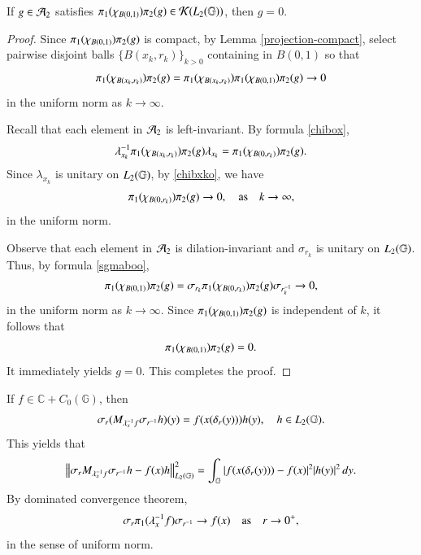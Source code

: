 \documentclass[leqno]{amsart}
\begin{document}
	\begin{lemma}\label{compact-zero}
		If $g\in{\mathcal A}_{2}$ satisfies $\pi_{1}(\chi_{B(0,1)})\pi_{2}(g)\in{\mathcal K}(L_{2}(\mathbb{G}))$, then $g=0$.
	\end{lemma}
	\begin{proof}
		Since $\pi_{1}(\chi_{B(0,1)})\pi_{2}(g)$ is compact, by Lemma \ref{projection-compact}, select  pairwise disjoint balls  $\{B(x_{k},r_{k})\}_{k>0}$ containing in $B(0,1)$ so that
		\begin{align}\label{chibxko}
			\pi_{1}(\chi_{B(x_{k},r_{k})})\pi_{2}(g)=\pi_{1}(\chi_{B(x_{k},r_{k})})\pi_{1}(\chi_{B(0,1)})\pi_{2}(g)\rightarrow0
		\end{align}
		in the uniform norm as $k\rightarrow\infty$.
		
		Recall that each element in ${\mathcal A}_{2}$ is left-invariant. By formula \eqref{chibox},
		\begin{align*}
			\lambda_{x_{k}}^{-1} \pi_{1}(\chi_{B(x_{k},r_{k})})\pi_{2}(g) \lambda_{x_{k}}=\pi_{1}(\chi_{B(0,r_{k})})\pi_{2}(g).
		\end{align*}
		Since $\lambda_{x_{k}}$ is unitary on $L_{2}(\mathbb{G})$, by \eqref{chibxko}, we have $$\pi_{1}(\chi_{B(0,r_{k})})\pi_{2}(g)\rightarrow0,\quad\mbox{as}\quad k\rightarrow\infty,$$
		in the uniform norm.
		
		Observe that each element in ${\mathcal A}_{2}$ is dilation-invariant and $\sigma_{r_{k}}$ is unitary on $L_{2}(\mathbb{G})$. Thus, by formula \eqref{sgmaboo},
		\begin{align*}
			\pi_{1}(\chi_{B(0,1)})\pi_{2}(g)=\sigma_{r_{k}}\pi_{1}(\chi_{B(0,r_{k})})\pi_{2}(g)\sigma_{r_{k}^{-1}}\rightarrow0,
		\end{align*}
		in the uniform norm as $k\rightarrow\infty$. 
		Since $\pi_{1}(\chi_{B(0,1)})\pi_{2}(g)$ is independent of $k$, it follows that
		\begin{align*}
			\pi_{1}(\chi_{B(0,1)})\pi_{2}(g)=0.
		\end{align*}
		It immediately yields $g=0$. This completes the proof.
	\end{proof}
	
	
	
	
	\medskip
	
	
	
	If $f\in \mathbb{C}+C_0(\mathbb{G})$, then
	\begin{align*}
		\sg{r}(M_{\lambda_{x}\rp f}\sg{r\rp}h)(y)%
		=f(x(\dl{r}(y)))h(y),\quad h\in\lp{2}.
	\end{align*}
	This yields that
	\begin{align*}
		\left\| \sigma_{r}M_{\lambda_{x}^{-1} f}\sigma_{r^{-1}}h-f(x)h \right\|_{L_{2}(\mathbb{G})}^{2}=\int_{\mathbb{G}}|f(x(\delta_{r}(y)))-f(x)|^{2}|h(y)|^{2}\,dy.
	\end{align*}
	By dominated convergence theorem, 
	\begin{align}\label{convergencef(x)}
		\sigma_{r}\pi_{1}(\lambda_{x}^{-1} f)\sigma_{r^{-1}}\rightarrow f(x)\quad\mbox{as}\quad r\rightarrow0^{+},
	\end{align}
	in the sense of uniform norm.
	
\end{document}
